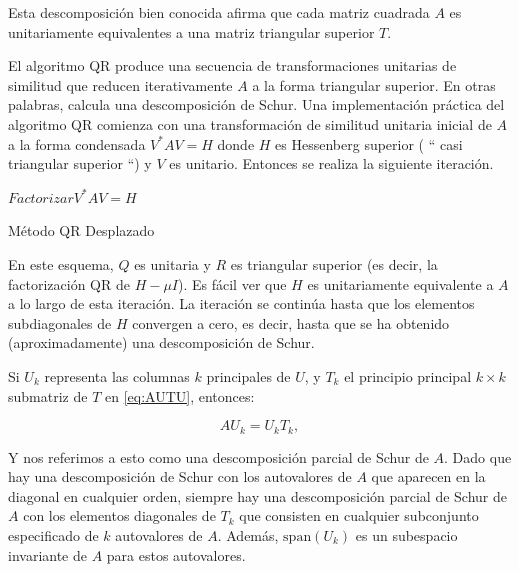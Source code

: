 \documentclass[a4paper,openright,12pt, oneside]{book}
\begin{document}
Esta descomposici\'on bien conocida afirma que cada matriz cuadrada $ A $ es unitariamente equivalentes a una matriz triangular superior $ T $.

El algoritmo QR produce una secuencia de transformaciones unitarias de similitud que reducen iterativamente $ A $ a la forma triangular superior. En otras palabras, calcula una descomposici\'on de Schur. Una implementaci\'on pr\'actica del algoritmo QR comienza con una transformaci\'on de similitud unitaria inicial de $ A $ a la forma condensada $ V ^ {\ast} AV = H $ donde $ H $ es Hessenberg superior ( `` casi triangular superior ``) y $ V $ es unitario. Entonces se realiza la siguiente iteraci\'on.

\begin{algorithm}
    \label{alg:SHIFTMETHOD}


    $Factorizar V^{\ast} AV = H$ \\


    \caption{M\'etodo QR Desplazado}
\end{algorithm}

En este esquema, $ Q $ es unitaria y $ R $ es triangular superior (es decir, la factorizaci\'on QR de $ H - \mu I $). Es f\'acil ver que $ H $ es unitariamente equivalente a $ A $ a lo largo de esta iteraci\'on. La iteraci\'on se contin\'ua hasta que los elementos subdiagonales de $ H $ convergen a cero, es decir, hasta que se ha obtenido (aproximadamente) una descomposici\'on de Schur.

Si $ U_k $ representa las columnas $ k $ principales de $ U $, y $ T_k $ el principio principal $ k \times k $ submatriz de $ T $ en \ref{eq:AUTU}, entonces:

\begin{displaymath}
A U_k = U_k T_k,
\end{displaymath}

Y nos referimos a esto como una descomposici\'on parcial de Schur de $ A $. Dado que hay una descomposici\'on de Schur con los autovalores de $ A $ que aparecen en la diagonal en cualquier orden, siempre hay una descomposici\'on parcial de Schur de $ A $ con los elementos diagonales de $ T_k $ que consisten en cualquier subconjunto especificado de $ k $ autovalores de $ A $. Adem\'as, $ \mbox{span} (U_k) $ es un subespacio invariante de $ A $ para estos autovalores.
\end{document}
